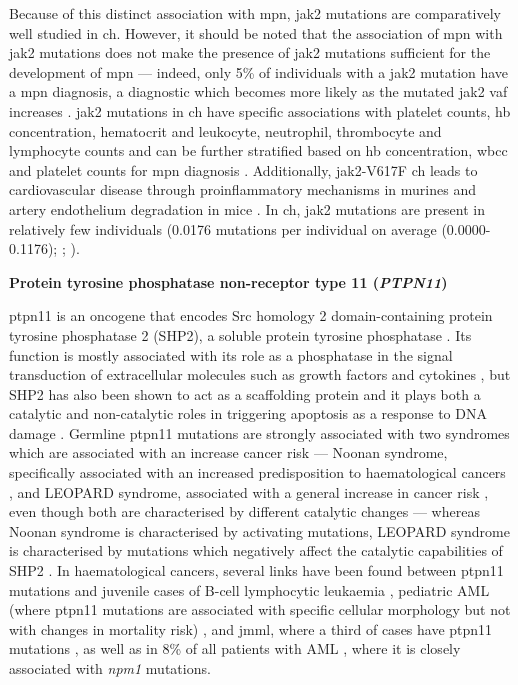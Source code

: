 Because of this distinct association with \ac{mpn}, \ac{jak2} mutations are comparatively well studied in \ac{ch}. However, it should be noted that the association of \ac{mpn} with \ac{jak2} mutations does not make the presence of \ac{jak2} mutations sufficient for the development of \ac{mpn} --- indeed, only 5\% of individuals with a \ac{jak2} mutation have a \ac{mpn} diagnosis, a diagnostic which becomes more likely as the mutated \ac{jak2} \ac{vaf} increases \cite{Cordua2019-mo}. \ac{jak2} mutations in \ac{ch} have specific associations with platelet counts, \ac{hb} concentration, hematocrit and leukocyte, neutrophil, thrombocyte and lymphocyte counts \cite{Dawoud2020-af,Cordua2019-mo} and can be further stratified based on \ac{hb} concentration, \ac{wbcc} and platelet counts for \ac{mpn} diagnosis \cite{Sochacki2019-mu,Dawoud2020-af}. Additionally, \ac{jak2}-V617F \ac{ch} leads to cardiovascular disease through proinflammatory mechanisms in murines and artery endothelium degradation in mice \cite{Sano2019-hm,Molinaro_Roberto2020-hd}. In \ac{ch}, \ac{jak2} mutations are present in relatively few individuals \cite{Jaiswal2014-rl,Genovese2014-eu,Zink2017-zi,Bolton2020-ct,Coombs2017-ph,McKerrell2015-rl,Acuna-Hidalgo2017-ng,Desai2018-pj,Young2016-du,Young2019-rz} (0.0176 mutations per individual on average (0.0000-0.1176); ; ).

\noindent \textbf{Protein tyrosine phosphatase non-receptor type 11 (\textit{PTPN11})}

\Ac{ptpn11} is an oncogene that encodes Src homology 2 domain-containing protein tyrosine phosphatase 2 (SHP2), a soluble protein tyrosine phosphatase \cite{Chan2007-xf}. Its function is mostly associated with its role as a phosphatase in the signal transduction of extracellular molecules such as growth factors and cytokines \cite{Chan2008-zh}, but SHP2 has also been shown to act as a scaffolding protein \cite{Bennett1994-wa,Li1994-xn} and it plays both a catalytic and non-catalytic roles in triggering apoptosis as a response to DNA damage \cite{Yuan2005-xt}. Germline \ac{ptpn11} mutations are strongly associated with two syndromes which are associated with an increase cancer risk --- Noonan syndrome, specifically associated with an increased predisposition to haematological cancers \cite{Tartaglia2001-ru},  and LEOPARD syndrome, associated with a general increase in cancer risk \cite{Digilio2002-nq}, even though both are characterised by different catalytic changes --- whereas Noonan syndrome is characterised by activating mutations, LEOPARD syndrome is characterised by mutations which negatively affect the catalytic capabilities of SHP2 \cite{Kontaridis2006-ia}. In haematological cancers, several links have been found between \ac{ptpn11} mutations and juvenile cases of B-cell lymphocytic leukaemia \cite{Tartaglia2004-lc}, pediatric AML (where \ac{ptpn11} mutations are associated with specific cellular morphology but not with changes in mortality risk) \cite{Loh2004-fg}, and \ac{jmml}, where a third of cases have \ac{ptpn11} mutations \cite{Tartaglia2003-xw,Kratz2005-qh}, as well as in 8\% of all patients with AML \cite{Fobare2020-et}, where it is closely associated with \textit{npm1} mutations.


